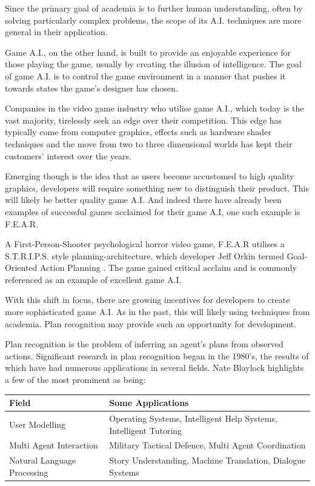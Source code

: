 \documentclass[parskip]{cs4rep}
\begin{document}
Since the primary goal of academia is to further human understanding, often by solving particularly complex problems, the scope of its A.I. techniques are more general in their application.

Game A.I., on the other hand, is built to provide an enjoyable experience for those playing the game, usually by creating the illusion of intelligence. The goal of game A.I. is to control the game environment in a manner that pushes it towards states the game’s designer has chosen. 

Companies in the video game industry who utilise game A.I., which today is the vast majority, tirelessly seek an edge over their competition. This edge has typically come from computer graphics, effects such as hardware shader techniques and the move from two to three dimensional worlds has kept their customers’ interest over the years. 

Emerging though is the idea that as users become accustomed to high quality graphics, developers will require something new to distinguish their product. This will likely be better quality game A.I. And indeed there have already been examples of successful games acclaimed for their game A.I, one such example is F.E.A.R. 

A First-Person-Shooter psychological horror video game, F.E.A.R utilises a S.T.R.I.P.S. style planning-architecture, which developer Jeff Orkin termed Goal-Oriented Action Planning \cite{citeulike:5386647}. The game gained critical acclaim and is commonly referenced as an example of excellent game A.I.

With this shift in focus, there are growing incentives for developers to create more sophisticated game A.I. As in the past, this will likely using techniques from academia. Plan recognition may provide such an opportunity for development.  

Plan recognition is the problem of inferring an agent's plans from observed actions. Significant research in plan recognition began in the 1980's, the results of which have had numerous applications in several fields. Nate Blaylock highlights \cite{oai:CiteSeerPSU:538953} a few of the most prominent as being:

\begin{tabular}{|l|p{8cm}|}
\hline 
\textbf{Field} & \textbf{Some Applications} \\ 
\hline 
User Modelling & Operating Systems, Intelligent Help Systems, Intelligent Tutoring \\ 
\hline 
Multi Agent Interaction & Military Tactical Defence, Multi Agent Coordination \\ 
\hline 
Natural Language Processing & Story Understanding, Machine Translation, Dialogue Systems \\ 
\hline
\end{tabular} 
\end{document}
